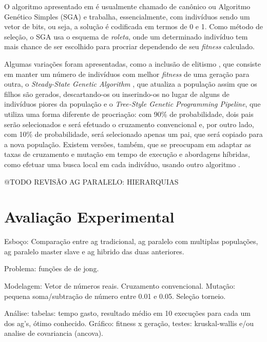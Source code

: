 \documentclass[12pt]{article}
\begin{document}
O algoritmo apresentado em \cite{holland1975} é usualmente chamado de canônico \cite{yang2002} ou Algoritmo Genético Simples (SGA)\cite{gasurvey} e trabalha, essencialmente, com indivíduos sendo um vetor de bits, ou seja, a solução é codificada em termos de 0 e 1. Como método de seleção, o SGA usa o esquema de \emph{roleta}, onde um determinado indivíduo tem mais chance de ser escolhido para procriar dependendo de seu \emph{fitness}
 calculado.

Algumas variações foram apresentadas, como a inclusão de elitismo \cite{dejong1975}, que consiste em manter um número de indivíduos com melhor \emph{fitness} de uma geração para outra, o \emph{Steady-State Genetic Algorithm} \cite{whitley1988}, que atualiza a população assim que os filhos são gerados, descartando-os ou inserindo-os no lugar de alguns de indivíduos piores da população e o \emph{Tree-Style Genetic Programming Pipeline}, que utiliza uma forma diferente de procriação: com 90\% de probabilidade, dois pais serão selecionados e será efetuado o cruzamento convencional e, por outro lado, com 10\% de probabilidade, será selecionado apenas um pai, que será copiado para a nova população. Existem versões, também, que se preocupam em adaptar as taxas de cruzamento e mutação em tempo de execução e abordagens híbridas, como efetuar uma busca local em cada indivíduo, usando outro algoritmo \cite{bersing1994} \cite{katare2000}.

@TODO REVISÃO AG PARALELO: HIERARQUIAS

\section{Avaliação Experimental}

Esboço: Comparação entre ag tradicional, ag paralelo com multiplas populações, ag paralelo master slave e ag hibrido das duas anteriores.

Problema: funções de de jong.

Modelagem: Vetor de números reais. Cruzamento convencional. Mutação: pequena soma/subtração de número entre 0.01 e 0.05. Seleção torneio.

Análise: tabelas: tempo gasto, resultado médio em 10 execuções para cada um dos ag's, ótimo conhecido. Gráfico: fitness x geração, testes: kruskal-wallis e/ou analise de covariancia (ancova).



\end{document}
